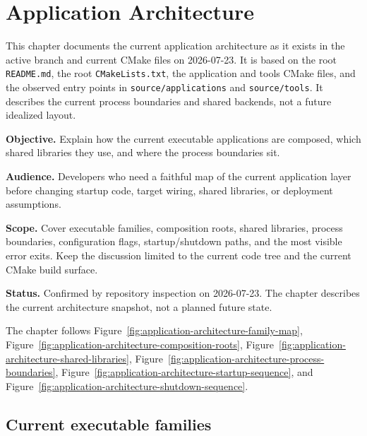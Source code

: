 \chapter{Application Architecture}
\label{chap:application-architecture}

This chapter documents the current application architecture as it exists in
the active branch and current CMake files on 2026-07-23. It is based on the
root \texttt{README.md}, the root \texttt{CMakeLists.txt}, the application and
tools CMake files, and the observed entry points in \texttt{source/applications}
and \texttt{source/tools}. It describes the current process boundaries and
shared backends, not a future idealized layout.

\noindent\textbf{Objective.} Explain how the current executable applications
are composed, which shared libraries they use, and where the process
boundaries sit.

\noindent\textbf{Audience.} Developers who need a faithful map of the current
application layer before changing startup code, target wiring, shared
libraries, or deployment assumptions.

\noindent\textbf{Scope.} Cover executable families, composition roots,
shared libraries, process boundaries, configuration flags, startup/shutdown
paths, and the most visible error exits. Keep the discussion limited to the
current code tree and the current CMake build surface.

\noindent\textbf{Status.} Confirmed by repository inspection on 2026-07-23.
The chapter describes the current architecture snapshot, not a planned future
state.

The chapter follows Figure~\ref{fig:application-architecture-family-map},
Figure~\ref{fig:application-architecture-composition-roots},
Figure~\ref{fig:application-architecture-shared-libraries},
Figure~\ref{fig:application-architecture-process-boundaries},
Figure~\ref{fig:application-architecture-startup-sequence}, and
Figure~\ref{fig:application-architecture-shutdown-sequence}.

\section{Current executable families}
\label{sec:application-architecture-families}

